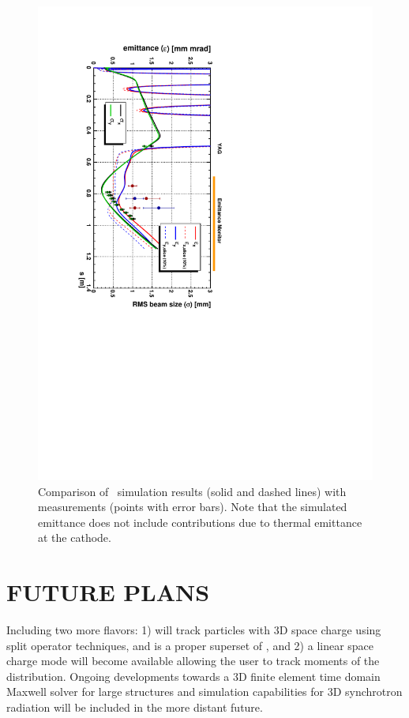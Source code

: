 \documentclass[acus]{JAC2003}
\begin{document}
\begin{figure}[htb]
\begin{center}
\includegraphics[angle=90,width=.99\linewidth]{./OBLA-Jul22.pdf}
\end{center}
\vspace{-9mm}
\caption{Comparison of \opal\ simulation results (solid and dashed lines) with measurements (points with
error bars). Note that the simulated emittance does not include contributions due to thermal emittance at
the cathode.}
\label{fig:comp}
\end{figure}

\vspace{-4mm}
\section{FUTURE PLANS}
Including  two more flavors: 1) \opalmap will track particles with 3D space charge using split operator techniques, and is a proper superset of \madninep \cite{mad9}, and 2)  
a linear space charge mode will become available allowing the user to track moments of the distribution. 
Ongoing  developments towards a 3D finite element time domain Maxwell solver for large structures and simulation capabilities for 3D synchrotron radiation will be included in the more distant future.
\end{document}
